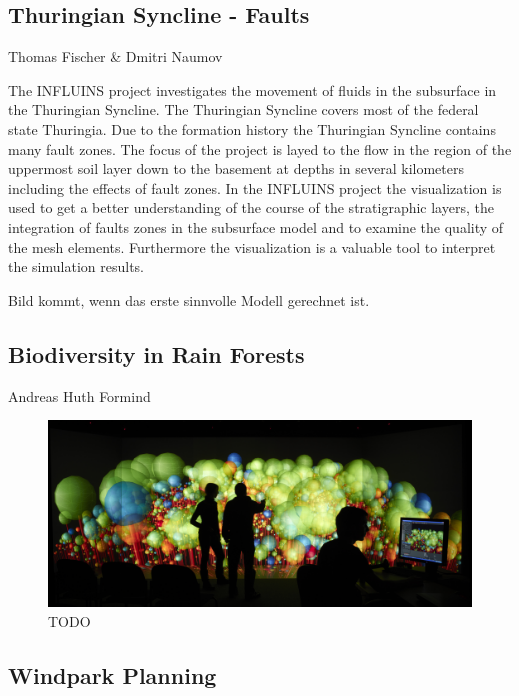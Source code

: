 \documentclass[twocolumn]{svjour3}          %
\begin{document}
\subsection{Thuringian Syncline - Faults}
\label{thuringian-syncline---faults}
Thomas Fischer \& Dmitri Naumov

The INFLUINS project investigates the movement of fluids in the subsurface in
the Thuringian Syncline. The Thuringian Syncline covers most of the federal
state Thuringia. Due to the formation history the Thuringian Syncline contains
many fault zones. The focus of the project is layed to the flow in the region
of the uppermost soil layer down to the basement at depths in several
kilometers including the effects of fault zones. In the INFLUINS project the
visualization is used to get a better understanding of the course of the
stratigraphic layers, the integration of faults zones in the subsurface model
and to examine the quality of the mesh elements. Furthermore the visualization
is a valuable tool to interpret the simulation results.

Bild kommt, wenn das erste sinnvolle Modell gerechnet ist.

\subsection{Biodiversity in Rain Forests}
\label{biodiversity-in-rain-forests}

Andreas Huth Formind \cite{kohler:98}

\begin{figure}
  \includegraphics[width=\linewidth]{images/biodiversity.jpg}
\caption{TODO}
\label{fig:biodiversity}
\end{figure}

\subsection{Windpark Planning}
\label{windpark-planning}
\end{document}

